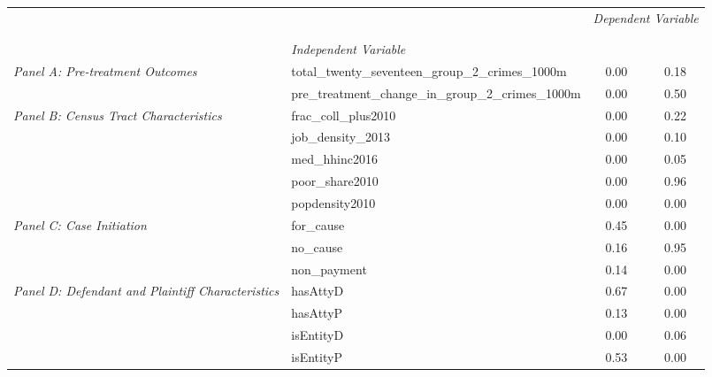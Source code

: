 \begin{tabular}{llcc}
\toprule
 &  & \multicolumn{2}{c}{\textit{Dependent Variable}} \\
\cline{3-4}
\\
 &  &  &  \\
 & \emph{Independent Variable} &  &  \\
\midrule
\multirow[c]{2}{3cm}{\textit{Panel A: Pre-treatment Outcomes}} & total_twenty_seventeen_group_2_crimes_1000m & 0.00 & 0.18 \\
 & pre_treatment_change_in_group_2_crimes_1000m & 0.00 & 0.50 \\
\cline{1-4}
\multirow[c]{5}{3cm}{\textit{Panel B: Census Tract Characteristics}} & frac_coll_plus2010 & 0.00 & 0.22 \\
 & job_density_2013 & 0.00 & 0.10 \\
 & med_hhinc2016 & 0.00 & 0.05 \\
 & poor_share2010 & 0.00 & 0.96 \\
 & popdensity2010 & 0.00 & 0.00 \\
\cline{1-4}
\multirow[c]{3}{3cm}{\textit{Panel C: Case Initiation}} & for_cause & 0.45 & 0.00 \\
 & no_cause & 0.16 & 0.95 \\
 & non_payment & 0.14 & 0.00 \\
\cline{1-4}
\multirow[c]{4}{3cm}{\textit{Panel D: Defendant and Plaintiff Characteristics}} & hasAttyD & 0.67 & 0.00 \\
 & hasAttyP & 0.13 & 0.00 \\
 & isEntityD & 0.00 & 0.06 \\
 & isEntityP & 0.53 & 0.00 \\
\cline{1-4}
\bottomrule
\end{tabular}
